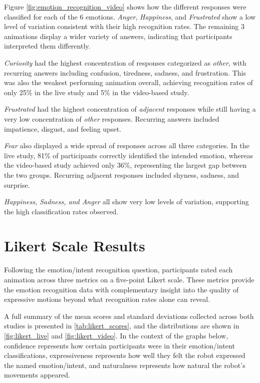 Figure \ref{fig:emotion_recognition_video} shows how the different responses were classified for each of the 6 emotions. \textit{Anger}, \textit{Happiness}, and \textit{Frustrated} show a low level of variation consistent with their high recognition rates. The remaining 3 animations display a wider variety of answers, indicating that participants interpreted them differently.





\newpage

\textit{Curiosity} had the highest concentration of responses categorized as \textit{other}, with recurring answers including confusion, tiredness, sadness, and frustration. This was also the weakest performing animation overall, achieving recognition rates of only 25\% in the live study and 5\% in the video-based study.

\textit{Frustrated} had the highest concentration of \textit{adjacent} responses while still having a very low concentration of \textit{other} responses. Recurring answers included impatience, disgust, and feeling upset.

\textit{Fear} also displayed a wide spread of responses across all three categories. In the live study, 81\% of participants correctly identified the intended emotion, whereas the video-based study achieved only 36\%, representing the largest gap between the two groups. Recurring adjacent responses included shyness, sadness, and surprise.

\textit{Happiness, Sadness, and Anger} all show very low levels of variation, supporting the high classification rates observed.





\newpage
\section{Likert Scale Results}
Following the emotion/intent recognition question, participants rated each animation across three metrics on a five-point Likert scale. These metrics provide the emotion recognition data with complementary insight into the quality of expressive motions beyond what recognition rates alone can reveal.

A full summary of the mean scores and standard deviations collected across both studies is presented in \ref{tab:likert_scores}, and the distributions are shown in \ref{fig:likert_live} and \ref{fig:likert_video}. In the context of the graphs below, confidence represents how certain participants were in their emotion/intent classifications, expressiveness represents how well they felt the robot expressed the named emotion/intent, and naturalness represents how natural the robot's movements appeared.

